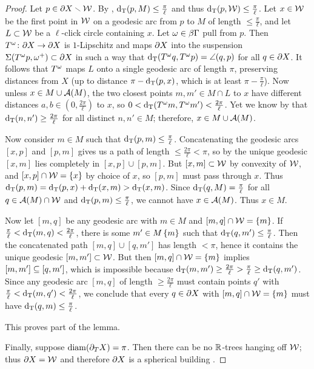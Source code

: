 \documentclass{amsart}
\newcommand{\bdT}{\partial_T}
\begin{document}
\begin{proof}
Let $p \in \partial X \smallsetminus \mathcal W$.  By , $\operatorname{d_T}(p, M) \le \frac{\pi}{\ell}$ and thus $\operatorname{d_T}(p, \mathcal W) \le \frac{\pi}{\ell}$.
Let $x \in \mathcal W$ be the first point in $\mathcal W$ on a geodesic arc from $p$ to $M$ of length $\le \frac{\pi}{\ell}$, and let $L \subset \mathcal W$ be a $\ell$-click circle containing $x$.
Let $\omega \in \beta \Gamma$ pull from $p$.
Then $T^{\omega} \colon \partial X \to \partial X$ is $1$-Lipschitz and maps $\partial X$ into the suspension $\operatorname{\Sigma} (T^{\omega} p, \omega^+) \subset \partial X$ in such a way that $\operatorname{d_T} (T^{\omega} q, T^{\omega} p) = \angle (q, p)$ for all $q \in \partial X$.
It follows that $T^{\omega}$ maps $L$ onto a single geodesic arc of length $\pi$, preserving distances from $X$ (up to distance $\pi - \operatorname{d_T}(p,x)$, which is at least $\pi - \frac{\pi}{\ell}$).
Now unless $x \in M \cup \operatorname{\mathcal A}(M)$, the two closest points $m, m' \in M \cap L$ to $x$ have different distances $a,b \in (0, \frac{2\pi}{\ell})$ to $x$, so $0 < \operatorname{d_T} (T^{\omega} m, T^{\omega} m') < \frac{2\pi}{\ell}$.
Yet we know by  that $\operatorname{d_T}(n,n') \ge \frac{2\pi}{\ell}$ for all distinct $n,n' \in M$; therefore, $x \in M \cup \operatorname{\mathcal A}(M)$.

Now consider $m \in M$ such that $\operatorname{d_T}(p,m) \le \frac{\pi}{\ell}$.
Concatenating the geodesic arcs $[x,p]$ and $[p,m]$ gives us a path of length $\le \frac{2\pi}{\ell} < \pi$, so by  the unique geodesic $[x,m]$ lies completely in $[x,p] \cup [p,m]$.
But $[x,m] \subset \mathcal W$ by convexity of $\mathcal W$, and $[x,p] \cap \mathcal W = \left\{x\right\}$ by choice of $x$, so $[p,m]$ must pass through $x$.
Thus $\operatorname{d_T}(p,m) = \operatorname{d_T}(p,x) + \operatorname{d_T}(x,m) > \operatorname{d_T}(x,m)$.
Since $\operatorname{d_T}(q,M) = \frac{\pi}{\ell}$ for all $q \in \operatorname{\mathcal A}(M) \cap \mathcal W$ and $\operatorname{d_T}(p,m) \le \frac{\pi}{\ell}$, we cannot have $x \in \operatorname{\mathcal A}(M)$.
Thus $x \in M$.

Now let $[m,q]$ be any geodesic arc with $m \in M$ and $[m,q] \cap \mathcal W = \left\{m\right\}$.
If $\frac{\pi}{\ell} < \operatorname{d_T}(m,q) < \frac{2\pi}{\ell}$, there is some $m' \in M \left\{m\right\}$ such that $\operatorname{d_T}(q,m') \le \frac{\pi}{\ell}$.
Then the concatenated path $[m,q] \cup [q,m']$ has length $< \pi$, hence it contains the unique geodesic $[m,m'] \subset \mathcal W$.
But then $[m,q] \cap \mathcal W = \left\{m\right\}$ implies $[m,m'] \subseteq [q,m']$, which is impossible because $\operatorname{d_T}(m,m') \ge \frac{2\pi}{\ell} > \frac{\pi}{\ell} \ge \operatorname{d_T}(q,m')$.
Since any geodesic arc $[m,q]$ of length $\ge \frac{2\pi}{\ell}$ must contain points $q'$ with $\frac{\pi}{\ell} < \operatorname{d_T}(m,q') < \frac{2\pi}{\ell}$, we conclude that every $q \in \partial X$ with $[m,q] \cap \mathcal W = \left\{m\right\}$ must have $\operatorname{d_T}(q,m) \le \frac{\pi}{\ell}$.

This proves part  of the lemma.

Finally, suppose $\diam (\bdT X) = \pi$.  Then there can be no $\mathbb{R}$-trees hanging off $\mathcal W$; thus $\partial X = \mathcal W$ and therefore $\partial X$ is a spherical building \cite[Theorem 6.1]{charney-lytchak}.
\end{proof}
\end{document}
